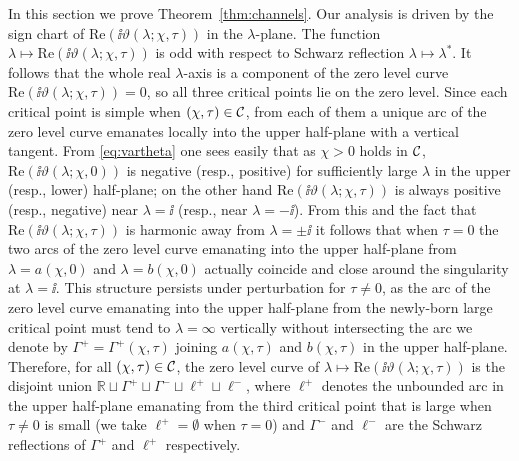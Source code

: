 \label{sec:channels}
In this section we prove Theorem~\ref{thm:channels}.  
Our analysis is driven by the sign chart of $\mathrm{Re}(\ii\vartheta(\lambda;\chi,\tau))$ in the $\lambda$-plane.  The function $\lambda\mapsto\mathrm{Re}(\ii\vartheta(\lambda;\chi,\tau))$ is odd with respect to Schwarz reflection $\lambda\mapsto \lambda^*$.  It follows that the whole real $\lambda$-axis is a component of the zero level curve $\mathrm{Re}(\ii\vartheta(\lambda;\chi,\tau))=0$, so all three critical points lie on the zero level.  Since each critical point is simple when $(\chi,\tau)\in\mathcal{C}$, from each of them a unique  arc of the zero level curve emanates locally into the upper half-plane with a vertical tangent.  From \eqref{eq:vartheta} one sees easily that as $\chi>0$ holds in $\mathcal{C}$, $\mathrm{Re}(\ii\vartheta(\lambda;\chi,0))$ is negative (resp., positive) for sufficiently large $\lambda$ in the upper (resp., lower) half-plane; on the other hand $\mathrm{Re}(\ii\vartheta(\lambda;\chi,\tau))$ is always positive (resp., negative) near $\lambda=\ii$ (resp., near $\lambda=-\ii$).  From this and the fact that $\mathrm{Re}(\ii\vartheta(\lambda;\chi,\tau))$ is harmonic away from $\lambda=\pm\ii$ it follows that when $\tau=0$ the two arcs of the zero level curve emanating into the upper half-plane from $\lambda=a(\chi,0)$ and $\lambda=b(\chi,0)$ actually coincide and close around the singularity at $\lambda=\ii$.  This structure persists under perturbation for $\tau\neq 0$, as the arc of the zero level curve emanating into the upper half-plane from the newly-born large critical point must tend to $\lambda=\infty$ vertically without intersecting the arc we denote by $\Gamma^+=\Gamma^+(\chi,\tau)$ joining $a(\chi,\tau)$ and $b(\chi,\tau)$ in the upper half-plane. Therefore, for all $(\chi,\tau)\in \mathcal{C}$, the zero level curve of $\lambda\mapsto\mathrm{Re}(\ii\vartheta(\lambda;\chi,\tau))$ is the disjoint union $\mathbb{R}\sqcup\Gamma^+\sqcup\Gamma^-\sqcup \ell^+\sqcup \ell^-$, where $\ell^+$ denotes the unbounded arc in the upper half-plane emanating from the third critical point that is large when $\tau\neq 0$ is small (we take $\ell^+=\emptyset$ when $\tau=0$) and $\Gamma^-$ and $\ell^-$ are the Schwarz reflections of $\Gamma^+$ and $\ell^+$ respectively.

